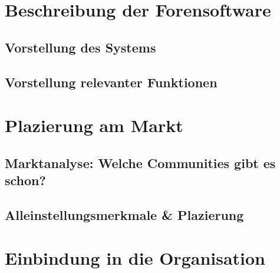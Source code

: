 \label{sec:hauptteil}

\section{Beschreibung der Forensoftware} %
\label{sec:beschreibung_der_forensoftware}

\subsection{Vorstellung des Systems} %
\label{sub:vorstellung_des_systems}


\subsection{Vorstellung relevanter Funktionen} %
\label{sub:vorstellung_relevanter_funktionen}



\section{Plazierung am Markt} %
\label{sec:plazierung_am_markt}

\subsection{Marktanalyse: Welche Communities gibt es schon?} %
\label{sub:marktanalyse_welche_communities_gibt_es_schon}


\subsection{Alleinstellungsmerkmale \& Plazierung} %
\label{sub:alleinstellungsmerkmale_plazierung}



\section{Einbindung in die Organisation} %
\label{sec:einbindung_in_die_organisation}

